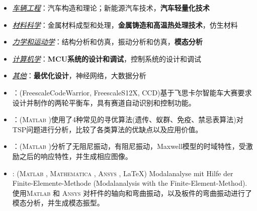 \documentclass[zh]{resume}
\newcommand{\Matlab}{\textsc{Matlab}\textsuperscript{\textregistered} }
\newcommand{\Ansys}{\textsc{Ansys}\textsuperscript{\textregistered} }
\newcommand{\Mathematica}{\textsc{Mathematica}\textsuperscript{\textregistered} }
\newcommand{\Microsoft}{\textsc{Microsoft}\textsuperscript{\textregistered} }
\begin{document}
\begin{itemize}
  \item \textit{\underline{车辆工程}}：汽车构造和理论；新能源汽车技术，\textbf{汽车轻量化技术}
  \item \textit{\underline{材料科学}}：金属材料成型和处理，\textbf{金属铸造和高温热处理技术}，仿生材料
  \item \textit{\underline{力学和运动学}}：结构分析和仿真，振动分析和仿真，\textbf{模态分析}
  \item \textit{\underline{计算机学}}：\textbf{MCU系统的设计和调试}，控制系统的设计和调试
  \item \textit{\underline{其他}}：\textbf{最优化设计}，神经网络，大数据分析
\end{itemize}

% 
%  
%  
%  

\begin{itemize}
	\item {}：(Freescale\textregistered CodeWarrior, Freescale\textregistered S12X, CCD)基于飞思卡尔智能车大赛要求设计并制作的两轮平衡车，具有赛道自动识别和控制功能。
	
	\item {}：(\Matlab)使用了4种常见的寻优算法(遗传、蚁群、免疫、禁忌表算法)对TSP问题进行分析，比较了各类算法的优缺点以及应用价值。
	
	\item {}：(\Matlab)分析了无阻尼振动，有阻尼振动，Maxwell模型的时域特性，受激励之后的响应特性，并生成相应图像。
	
	\item {}: (\Matlab, \Mathematica, \Ansys, \LaTeX)
	      Modalanalyse mit Hilfe der Finite-Elemente-Methode (Modalanalysis with the Finite-Element-Method). 使用\Matlab 和 \Ansys 对杆件的轴向和弯曲振动，以及板件的弯曲振动进行了模态分析，并生成模态振型。
  		
\end{itemize}
\end{document}
